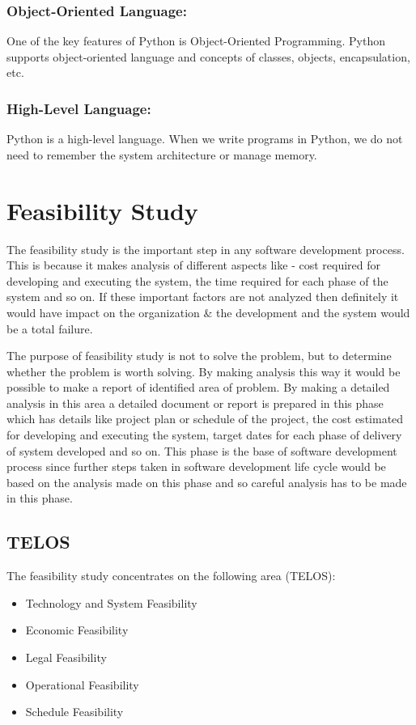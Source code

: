 \documentclass[12pt, a4paper]{report}
\begin{document}
    \subsubsection{Object-Oriented Language:}
    One of the key features of Python is Object-Oriented Programming. Python supports object-oriented language and concepts of classes, objects, encapsulation, etc.
    
    \subsubsection{High-Level Language:}
    Python is a high-level language. When we write programs in Python, we do not need to remember the system architecture or manage memory.
    
  \newpage
  \section{Feasibility Study}
   The feasibility study is the important step in any software development process. This is because it makes analysis of different aspects like - cost required for developing and executing the system, the time required for each phase of the system and so on. If these important factors are not analyzed then definitely it would have impact on the organization & the development and the system would be a total failure.

  The purpose of feasibility study is not to solve the problem, but to determine whether the problem is worth solving. By making analysis this way it would be possible to make a report of identified area of problem. By making a detailed analysis in this area a detailed document or report is prepared in this phase which has details like project plan or schedule of the project, the cost estimated for developing and executing the system, target dates for each phase of delivery of system developed and so on. This phase is the base of software development process since further steps taken in software development life cycle would be based on the analysis made on this phase and so careful analysis has to be made in this phase.
  
  \subsection{TELOS}
  
    The feasibility study concentrates on the following area (TELOS):
    \begin{itemize}
      \item Technology and System Feasibility
      \item Economic Feasibility
      \item Legal Feasibility
      \item Operational Feasibility
      \item Schedule Feasibility
    \end{itemize}
  
\end{document}
